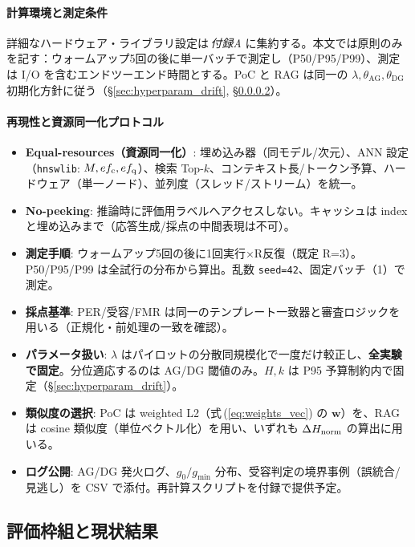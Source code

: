 \documentclass[ja=standard,xelatex]{bxjsarticle}
\begin{document}
\paragraph{計算環境と測定条件}
詳細なハードウェア・ライブラリ設定は\,\emph{付録A} に集約する。本文では原則のみを記す：ウォームアップ5回の後に単一バッチで測定し（P50/P95/P99）、測定は I/O を含むエンドツーエンド時間とする。PoC と RAG は同一の $\lambda,\theta_{\mathrm{AG}},\theta_{\mathrm{DG}}$ 初期化方針に従う（\S\ref{sec:hyperparam_drift}, \S\ref{sec:repro_protocol}）。
\paragraph{再現性と資源同一化プロトコル}\label{sec:repro_protocol}
\begin{itemize}[leftmargin=*]
  \item \textbf{Equal-resources（資源同一化）}: 埋め込み器（同モデル/次元）、ANN 設定（\texttt{hnswlib}: $M,ef_{\rm c},ef_{\rm q}$）、検索 Top-$k$、コンテキスト長/トークン予算、ハードウェア（単一ノード）、並列度（スレッド/ストリーム）を統一。
  \item \textbf{No-peeking}: 推論時に評価用ラベルへアクセスしない。キャッシュは index と埋め込みまで（応答生成/採点の中間表現は不可）。
  \item \textbf{測定手順}: ウォームアップ5回の後に1回実行×R反復（既定 R=3）。P50/P95/P99 は全試行の分布から算出。乱数 \texttt{seed=42}、固定バッチ（1）で測定。
  \item \textbf{採点基準}: PER/受容/FMR は同一のテンプレート一致器と審査ロジックを用いる（正規化・前処理の一致を確認）。
  \item \textbf{パラメータ扱い}: $\lambda$ はパイロットの分散同規模化で一度だけ較正し、\textbf{全実験で固定}。分位適応するのは AG/DG 閾値のみ。$H,k$ は P95 予算制約内で固定（\S\ref{sec:hyperparam_drift}）。
  \item \textbf{類似度の選択}: PoC は weighted L2（式\,(\ref{eq:weights_vec}) の $\mathbf{w}$）を、RAG は cosine 類似度（単位ベクトル化）を用い、いずれも $\Delta H_{\rm norm}$ の算出に用いる。
  \item \textbf{ログ公開}: AG/DG 発火ログ、$g_0/g_{\min}$ 分布、受容判定の境界事例（誤統合/見逃し）を CSV で添付。再計算スクリプトを付録で提供予定。
\end{itemize}


\subsection{評価枠組と現状結果}
\end{document}
